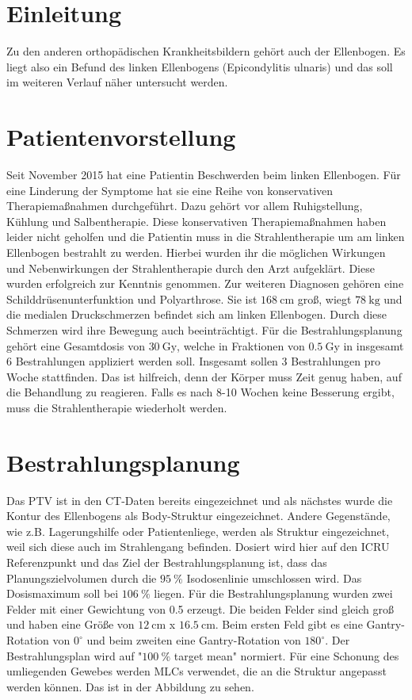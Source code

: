 \section{Einleitung}
\label{sec:Einleitung}
Zu den anderen orthopädischen Krankheitsbildern gehört auch der Ellenbogen. Es liegt also ein Befund des linken Ellenbogens (Epicondylitis ulnaris) und das soll im weiteren Verlauf näher untersucht werden.

\section{Patientenvorstellung}
\label{sec:Vorstellung}
Seit November 2015 hat eine Patientin Beschwerden beim linken Ellenbogen. Für eine Linderung der Symptome hat sie eine Reihe von konservativen Therapiemaßnahmen durchgeführt. Dazu gehört vor allem Ruhigstellung, Kühlung und Salbentherapie. Diese konservativen Therapiemaßnahmen haben leider nicht geholfen und die Patientin muss in die Strahlentherapie um am linken Ellenbogen bestrahlt zu werden. Hierbei wurden ihr die möglichen Wirkungen und Nebenwirkungen der Strahlentherapie durch den Arzt aufgeklärt. Diese wurden erfolgreich zur Kenntnis genommen. Zur weiteren Diagnosen gehören eine Schilddrüsenunterfunktion und Polyarthrose. Sie ist $\SI{168}{\centi\meter}$ groß, wiegt $\SI{78}{\kilo\gram}$ und die medialen Druckschmerzen befindet sich am linken Ellenbogen. Durch diese Schmerzen wird ihre Bewegung auch beeinträchtigt. Für die Bestrahlungsplanung gehört eine Gesamtdosis von $\SI{30}{\gray}$, welche in Fraktionen von $\SI{0,5}{\gray}$ in insgesamt 6 Bestrahlungen appliziert werden soll. Insgesamt sollen 3 Bestrahlungen pro Woche stattfinden. Das ist hilfreich, denn der Körper muss Zeit genug haben, auf die Behandlung zu reagieren. Falls es nach 8-10 Wochen keine Besserung ergibt, muss die Strahlentherapie wiederholt werden.

\section{Bestrahlungsplanung}
\label{sec:Bestrahlung}
Das PTV ist in den CT-Daten bereits eingezeichnet und als nächstes wurde die Kontur des Ellenbogens als Body-Struktur eingezeichnet. Andere Gegenstände, wie z.B. Lagerungshilfe oder Patientenliege, werden als Struktur eingezeichnet, weil sich diese auch im Strahlengang befinden. Dosiert wird hier auf den ICRU Referenzpunkt und das Ziel der Bestrahlungsplanung ist, dass das Planungszielvolumen durch die $\SI{95}{\percent}$ Isodosenlinie umschlossen wird. Das Dosismaximum soll bei $\SI{106}{\percent}$ liegen. Für die Bestrahlungsplanung wurden zwei Felder mit einer Gewichtung von 0.5 erzeugt. Die beiden Felder sind gleich groß und haben eine Größe von $\SI{12}{\centi\meter}$ x $\SI{16,5}{\centi\meter}$. Beim ersten Feld gibt es eine Gantry-Rotation von $0^\circ$ und beim zweiten eine Gantry-Rotation von $180^\circ$. Der Bestrahlungsplan wird auf "$\SI{100}{\percent}$ target mean" normiert. Für eine Schonung des umliegenden Gewebes werden MLCs verwendet, die an die Struktur angepasst werden können. Das ist in der Abbildung  zu sehen. 

